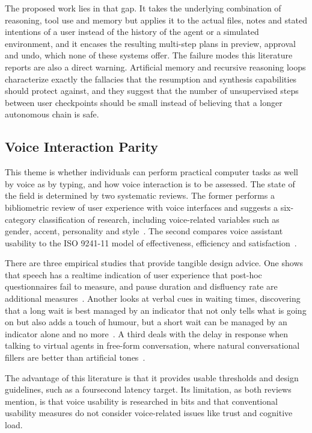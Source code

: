 \documentclass{FastFyp}
\begin{document}
The proposed work lies in that gap. It takes the underlying combination of reasoning, tool use and memory but applies it to the actual files, notes and stated intentions of a user instead of the history of the agent or a simulated environment, and it encases the resulting multi-step plans in preview, approval and undo, which none of these systems offer. The failure modes this literature reports are also a direct warning. Artificial memory and recursive reasoning loops characterize exactly the fallacies that the resumption and synthesis capabilities should protect against, and they suggest that the number of unsupervised steps between user checkpoints should be small instead of believing that a longer autonomous chain is safe.

\subsection{Voice Interaction Parity}
This theme is whether individuals can perform practical computer tasks as well by voice as by typing, and how voice interaction is to be assessed. The state of the field is determined by two systematic reviews. The former performs a bibliometric review of user experience with voice interfaces and suggests a six-category classification of research, including voice-related variables such as gender, accent, personality and style~\cite{ref:deshmukh2024}. The second compares voice assistant usability to the ISO 9241-11 model of effectiveness, efficiency and satisfaction~\cite{ref:dutsinma2022}.

There are three empirical studies that provide tangible design advice. One shows that speech has a realtime indication of user experience that post-hoc questionnaires fail to measure, and pause duration and disfluency rate are additional measures~\cite{ref:ma2026}. Another looks at verbal cues in waiting times, discovering that a long wait is best managed by an indicator that not only tells what is going on but also adds a touch of humour, but a short wait can be managed by an indicator alone and no more~\cite{ref:zhang2025}. A third deals with the delay in response when talking to virtual agents in free-form conversation, where natural conversational fillers are better than artificial tones~\cite{ref:wang2025}.

The advantage of this literature is that it provides usable thresholds and design guidelines, such as a foursecond latency target. Its limitation, as both reviews mention, is that voice usability is researched in bits and that conventional usability measures do not consider voice-related issues like trust and cognitive load.
\end{document}
